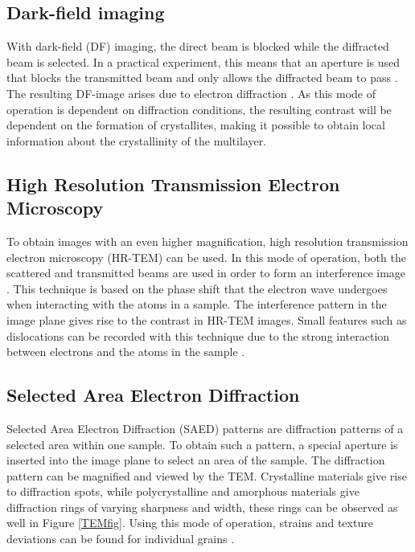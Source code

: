 \subsection{Dark-field imaging}
With dark-field (DF) imaging, the direct beam is blocked while the diffracted beam is selected. In a practical experiment, this means that an aperture is used that blocks the transmitted beam and only allows the diffracted beam to pass \cite{TEM_new}. The resulting DF-image arises due to electron diffraction \cite{thesis_naureen}. As this mode of operation is dependent on diffraction conditions, the resulting contrast will be dependent on the formation of crystallites, making it possible to obtain local information about the crystallinity of the multilayer. 
\subsection{High Resolution Transmission Electron Microscopy}
To obtain images with an even higher magnification, high resolution transmission electron microscopy (HR-TEM) can be used. In this mode of operation, both the scattered and transmitted beams are used in order to form an interference image \cite{thesis_naureen}. This technique is based on the phase shift that the electron wave undergoes when interacting with the atoms in a sample. The interference pattern in the image plane gives rise to the contrast in HR-TEM images. Small features such as dislocations can be recorded with this technique due to the strong interaction between electrons and the atoms in the sample \cite{HRTEM}. 

\subsection{Selected Area Electron Diffraction}
Selected Area Electron Diffraction (SAED) patterns are diffraction patterns of a selected area within one sample. To obtain such a pattern, a special aperture is inserted  into the image plane to select an area of the sample. The diffraction pattern can be magnified and viewed by the TEM. Crystalline materials give rise to diffraction spots, while polycrystalline and amorphous materials give diffraction rings of varying sharpness and width, these rings can be observed as well in Figure \ref{TEMfig}. Using this mode of operation, strains and texture deviations can be found for individual grains \cite{ohring}.  